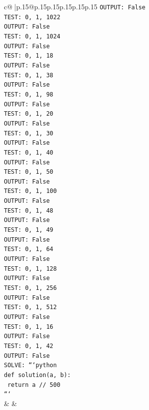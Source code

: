 \documentclass{article}
\begin{document}
{\begin{supertabular}{c@{$\;$}|p{.15\linewidth}@{}p{.15\linewidth}p{.15\linewidth}p{.15\linewidth}p{.15\linewidth}p{.15\linewidth}}
{{{\texttt{OUTPUT: False} \\
\texttt{TEST: 0, 1, 1022} \\
\texttt{OUTPUT: False} \\
\texttt{TEST: 0, 1, 1024} \\
\texttt{OUTPUT: False} \\
\texttt{TEST: 0, 1, 18} \\
\texttt{OUTPUT: False} \\
\texttt{TEST: 0, 1, 38} \\
\texttt{OUTPUT: False} \\
\texttt{TEST: 0, 1, 98} \\
\texttt{OUTPUT: False} \\
\texttt{TEST: 0, 1, 20} \\
\texttt{OUTPUT: False} \\
\texttt{TEST: 0, 1, 30} \\
\texttt{OUTPUT: False} \\
\texttt{TEST: 0, 1, 40} \\
\texttt{OUTPUT: False} \\
\texttt{TEST: 0, 1, 50} \\
\texttt{OUTPUT: False} \\
\texttt{TEST: 0, 1, 100} \\
\texttt{OUTPUT: False} \\
\texttt{TEST: 0, 1, 48} \\
\texttt{OUTPUT: False} \\
\texttt{TEST: 0, 1, 49} \\
\texttt{OUTPUT: False} \\
\texttt{TEST: 0, 1, 64} \\
\texttt{OUTPUT: False} \\
\texttt{TEST: 0, 1, 128} \\
\texttt{OUTPUT: False} \\
\texttt{TEST: 0, 1, 256} \\
\texttt{OUTPUT: False} \\
\texttt{TEST: 0, 1, 512} \\
\texttt{OUTPUT: False} \\
\texttt{TEST: 0, 1, 16} \\
\texttt{OUTPUT: False} \\
\texttt{TEST: 0, 1, 42} \\
\texttt{OUTPUT: False} \\
\texttt{SOLVE: ```python} \\
\texttt{def solution(a, b):} \\
\texttt{    return a // 500} \\
\texttt{```} \\
            }
        }
    }
    & & \\ \\


\end{supertabular}}
\end{document}
